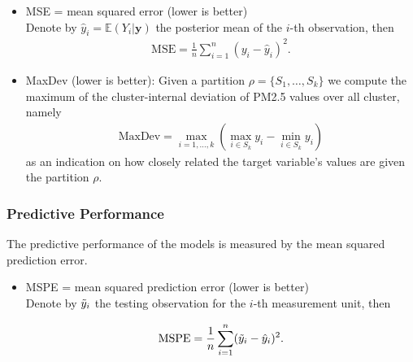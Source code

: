 \documentclass[12pt,a4paper]{article}
\begin{document}
\begin{itemize}
    \item MSE = mean squared error (lower is better)\\
    Denote by $\hat{y}_i = \mathbb{E}(Y_i | \mathbf{y})$ the posterior mean of the $i$-th observation, then
    \begin{align*}
        \text{MSE} = \frac{1}{n} \sum_{i=1}^n (y_i - \hat{y}_i)^2.
    \end{align*}

    \item MaxDev (lower is better): Given a partition $\rho
    = \{S_1, \ldots, S_k\}$ we compute the maximum of the cluster-internal 
    deviation of PM2.5 values over all cluster, namely
    \begin{align*}
        \text{MaxDev} = \max_{i=1, \ldots, k} \left(\max_{i\in S_k} y_i - 
        \min_{i\in S_k} y_i
         \right)
    \end{align*}
    as an indication on how closely related the target variable's
    values are given the partition $\rho$.
    

\end{itemize}

\subsubsection{Predictive Performance}

The predictive performance of the models is measured by the mean squared prediction error. \medskip

\begin{itemize}
    \item MSPE = mean squared prediction error (lower is better)\\
    Denote by $\Tilde{y}_i$ the testing observation for the $i$-th measurement unit, then

    \begin{align*}
        \text{MSPE} = \frac{1}{n} \sum_{i=1}^n (\Tilde{y}_i - \hat{y}_i)^2.
    \end{align*}
    
\end{itemize}
\end{document}
